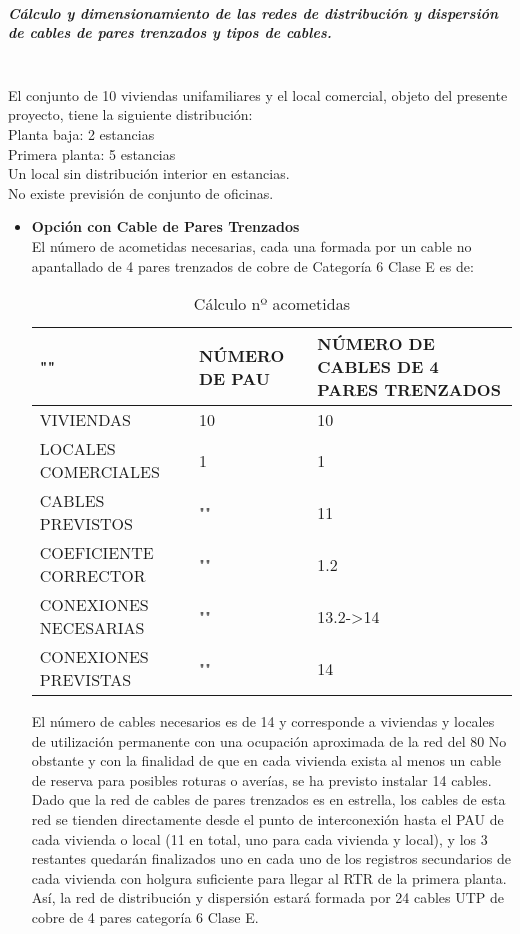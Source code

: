\subparagraph{Cálculo y dimensionamiento de las redes de distribución y dispersión de cables de pares trenzados y tipos de cables.}\textbf{}\\
El conjunto de 10 viviendas unifamiliares y el local comercial, objeto del presente
proyecto, tiene la siguiente distribución:\\
Planta baja:		2 estancias\\
Primera planta: 	5 estancias\\
Un local sin distribución interior en estancias.\\
No existe previsión de conjunto de oficinas.
\begin{itemize}
	\item \textbf{Opción con Cable de Pares Trenzados}\\
	El número de acometidas necesarias, cada una formada por un cable no apantallado de 4 pares trenzados de cobre de Categoría 6 Clase E es de:\\
	\begin{table}[H]
\centering
\begin{tabular}{p{5cm} p{5cm} p{5cm}}
\hline
""&NÚMERO DE PAU&NÚMERO DE CABLES DE 4 PARES TRENZADOS \\
\hline \hline
VIVIENDAS&10&10\\
\hline
LOCALES COMERCIALES&1&1\\
\hline
CABLES PREVISTOS&""&11\\
\hline
COEFICIENTE CORRECTOR&""&1.2\\
\hline
CONEXIONES NECESARIAS&""&13.2->14\\
\hline
CONEXIONES PREVISTAS&""&14
\end{tabular}

\caption{Cálculo nº acometidas}
\label{tabla:autores}
\end{table}

El número de cables necesarios es de 14 y corresponde a viviendas y locales de utilización permanente con una ocupación aproximada de la red del 80%
No obstante y con la finalidad de que en cada vivienda exista al menos un cable de reserva para
posibles roturas o averías, se ha previsto instalar 14 cables.\\
Dado que la red de cables de pares trenzados es en estrella, los cables de esta red se tienden
directamente desde el punto de interconexión hasta el PAU de cada vivienda o local (11 en total,
uno para cada vivienda y local), y los 3 restantes quedarán finalizados uno en cada uno de los
registros secundarios de cada vivienda con holgura suficiente para llegar al RTR de la primera planta.\\
Así, la red de distribución y dispersión estará formada por 24 cables UTP de cobre de 4 pares categoría 6 Clase E.

\end{itemize}

